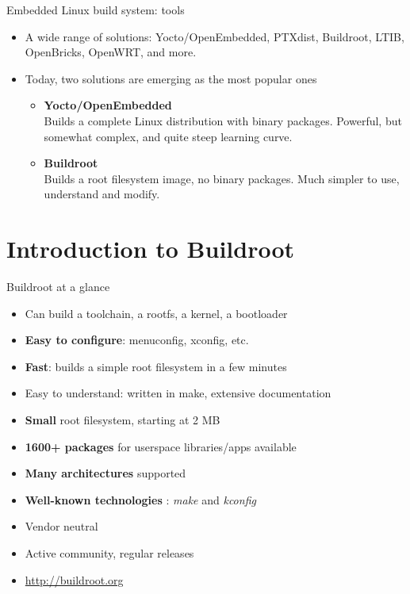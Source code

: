 \begin{frame}{Embedded Linux build system: tools}
  \begin{itemize}
  \item A wide range of solutions: Yocto/OpenEmbedded, PTXdist,
    Buildroot, LTIB, OpenBricks, OpenWRT, and more.
  \item Today, two solutions are emerging as the most popular ones
    \begin{itemize}
    \item {\bf Yocto/OpenEmbedded}\\Builds a complete Linux
      distribution with binary packages. Powerful, but somewhat
      complex, and quite steep learning curve.
    \item {\bf Buildroot}\\Builds a root filesystem image, no binary
      packages. Much simpler to use, understand and modify.
    \end{itemize}
  \end{itemize}
\end{frame}

\section{Introduction to Buildroot}

\begin{frame}{Buildroot at a glance}
  \begin{itemize}
  \item Can build a toolchain, a rootfs, a kernel, a bootloader
  \item {\bf Easy to configure}: menuconfig, xconfig, etc.
  \item {\bf Fast}: builds a simple root filesystem in a few minutes
  \item Easy to understand: written in make, extensive documentation
  \item {\bf Small} root filesystem, starting at 2 MB
  \item {\bf 1600+ packages} for userspace libraries/apps available
  \item {\bf Many architectures} supported
  \item {\bf Well-known technologies} : {\em make} and {\em kconfig}
  \item Vendor neutral
  \item Active community, regular releases
  \item \url{http://buildroot.org}
  \end{itemize}
\end{frame}

